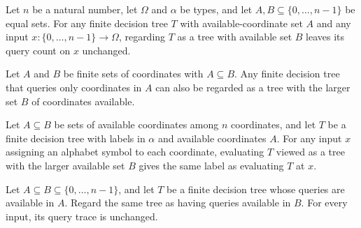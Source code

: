 \begin{theorem}
\label{FABL.FiniteDecisionTree.queryCount_castAvailable}
\leanok
{}
Let $n$ be a natural number, let $\Omega$ and $\alpha$ be types, and let
$A,B\subseteq\{0,\ldots,n-1\}$ be equal sets. For any finite decision tree $T$ with
available-coordinate set $A$ and any input $x:\{0,\ldots,n-1\}\to\Omega$, regarding $T$
as a tree with available set $B$ leaves its query count on $x$ unchanged.
\end{theorem}

\begin{definition}
\label{FABL.FiniteDecisionTree.weaken}
\leanok
{}
Let $A$ and $B$ be finite sets of coordinates with $A\subseteq B$. Any finite decision
tree that queries only coordinates in $A$ can also be regarded as a tree with the larger
set $B$ of coordinates available.
\end{definition}

\begin{theorem}
\label{FABL.FiniteDecisionTree.eval_weaken}
\leanok
{}
Let $A\subseteq B$ be sets of available coordinates among $n$ coordinates, and let $T$
be a finite decision tree with labels in $\alpha$ and available coordinates $A$. For any
input $x$ assigning an alphabet symbol to each coordinate, evaluating $T$ viewed as a
tree with the larger available set $B$ gives the same label as evaluating $T$ at $x$.
\end{theorem}

\begin{theorem}
\label{FABL.FiniteDecisionTree.queryTrace_weaken}
\leanok
{}
Let $A\subseteq B\subseteq\{0,\ldots,n-1\}$, and let $T$ be a finite decision tree whose
queries are available in $A$. Regard the same tree as having queries available in $B$.
For every input, its query trace is unchanged.
\end{theorem}

